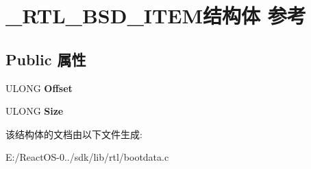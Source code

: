 \hypertarget{struct___r_t_l___b_s_d___i_t_e_m}{}\section{\+\_\+\+R\+T\+L\+\_\+\+B\+S\+D\+\_\+\+I\+T\+E\+M结构体 参考}
\label{struct___r_t_l___b_s_d___i_t_e_m}
\subsection*{Public 属性}
\begin{DoxyCompactItemize}
\item 
\mbox{\label{struct___r_t_l___b_s_d___i_t_e_m_a9f6dccb6aee0f3342dcf03c55dcfd91c}} 
U\+L\+O\+NG {\bfseries Offset}
\item 
\mbox{\label{struct___r_t_l___b_s_d___i_t_e_m_a6380b8e7a2bcd3112901443a15c6bc05}} 
U\+L\+O\+NG {\bfseries Size}
\end{DoxyCompactItemize}


该结构体的文档由以下文件生成\+:\begin{DoxyCompactItemize}
\item 
E\+:/\+React\+O\+S-\/0../sdk/lib/rtl/bootdata.\+c\end{DoxyCompactItemize}
